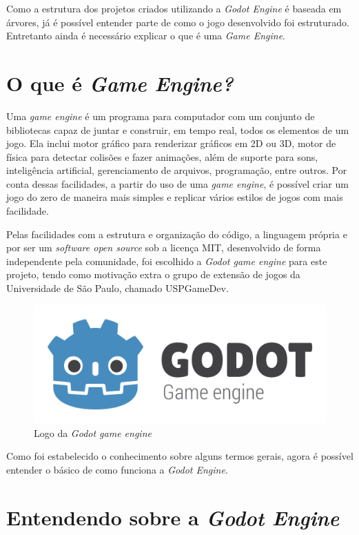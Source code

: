 Como a estrutura dos projetos criados utilizando a \textit{Godot Engine} é 
baseada em árvores, já é possível entender parte de como o jogo desenvolvido foi 
estruturado. Entretanto ainda é necessário explicar o que é uma 
\textit{Game Engine}.


\section{O que é \textit{Game Engine?}}

Uma \textit{game engine} é um programa para computador com um conjunto de 
bibliotecas capaz de juntar e construir, em tempo real, todos os elementos de um
jogo.
Ela inclui motor gráfico para renderizar gráficos em 2D ou 3D, motor de física 
para detectar colisões e fazer animações, além de suporte para sons, 
inteligência artificial, gerenciamento de arquivos, programação, entre outros.
Por conta dessas facilidades, a partir do uso de uma \textit{game engine}, é 
possível criar um jogo do zero de maneira mais simples e replicar vários estilos
de jogos com mais facilidade.

Pelas facilidades com a estrutura e organização do código, a linguagem própria 
e por ser um \textit{software open source} sob a licença MIT, desenvolvido de 
forma independente pela comunidade, foi escolhido a
\textit{Godot game engine} para este projeto, tendo como motivação extra o grupo
de extensão de jogos da Universidade de São Paulo, chamado USPGameDev.

\begin{figure}[H]
    \includegraphics[scale=0.25]{../figuras/godot_logo.png}
    \caption{Logo da \textit{Godot game engine}}
\end{figure}


Como foi estabelecido o conhecimento sobre alguns termos gerais, agora é
possível entender o básico de como funciona a \textit{Godot Engine}.

\section{Entendendo sobre a \textit{Godot Engine}}

